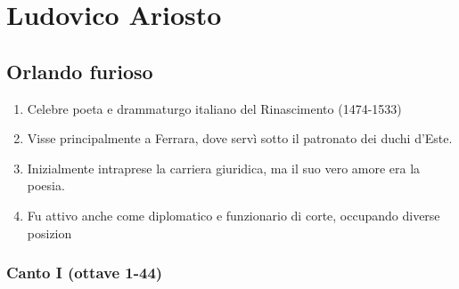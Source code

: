 \documentclass{article}
\begin{document}
\newpage
\section{Ludovico Ariosto}

\subsection{Orlando furioso}

\begin{enumerate}
    \item Celebre poeta e drammaturgo italiano del Rinascimento (1474-1533)
    \item Visse principalmente a Ferrara, dove servì sotto il patronato dei duchi d'Este.
    \item Inizialmente intraprese la carriera giuridica, ma il suo vero amore era la poesia.
    \item Fu attivo anche come diplomatico e funzionario di corte, occupando diverse posizion
\end{enumerate}

\subsubsection{Canto I (ottave 1-44)}
\end{document}
